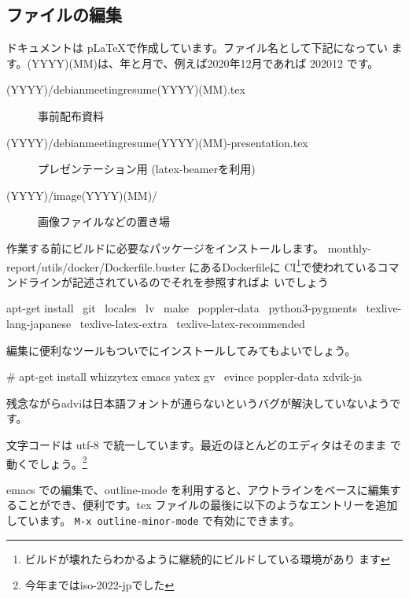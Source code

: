 \documentclass[mingoth,a4paper]{jsarticle}
\begin{document}
\subsection{ファイルの編集}

ドキュメントは p\LaTeX{}で作成しています。ファイル名として下記になってい
ます。(YYYY)(MM)は、年と月で、例えば2020年12月であれば 202012 です。

\begin{description}
 \item[(YYYY)/debianmeetingresume(YYYY)(MM).tex]
	    事前配布資料
 \item[(YYYY)/debianmeetingresume(YYYY)(MM)-presentation.tex]
	    プレゼンテーション用 (latex-beamerを利用)
 \item[(YYYY)/image(YYYY)(MM)/]
	    画像ファイルなどの置き場
\end{description}

作業する前にビルドに必要なパッケージをインストールします。
monthly-report/utils/docker/Dockerfile.buster にあるDockerfileに
CI\footnote{ビルドが壊れたらわかるように継続的にビルドしている環境があり
ます}で使われているコマンドラインが記述されているのでそれを参照すればよ
いでしょう

\begin{commandline}
apt-get install \
    git \
    locales \
    lv \
    make \
    poppler-data \
    python3-pygments \
    texlive-lang-japanese \
    texlive-latex-extra \
    texlive-latex-recommended
\end{commandline}

編集に便利なツールもついでにインストールしてみてもよいでしょう。

\begin{commandline}
# apt-get install whizzytex emacs yatex gv \
  evince poppler-data xdvik-ja
\end{commandline}

残念ながらadviは日本語フォントが通らないというバグが解決していないようです。


文字コードは utf-8 で統一しています。最近のほとんどのエディタはそのまま
で動くでしょう。\footnote{今年まではiso-2022-jpでした}

emacs での編集で、outline-mode を利用すると、アウトラインをベースに編集す
ることができ、便利です。tex ファイルの最後に以下のようなエントリーを追加
しています。
\texttt{M-x outline-minor-mode} で有効にできます。
\end{document}
